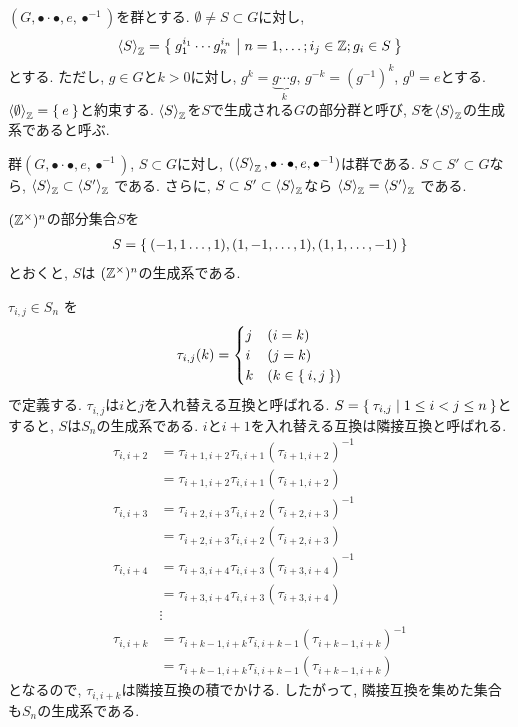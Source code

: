 \begin{definition}
  $(G,\bullet\cdot\bullet,e,\bullet^{-1})$を群とする.
  $\emptyset \neq S\subset G$に対し,
  \begin{align*}
    \Braket{S}_{\mathbb{Z}}=\Set{g_1^{i_1}\cdots g_n^{i_n}|n=1,\ldots;i_j\in \mathbb{Z};g_i\in S}
  \end{align*}
  とする.
  ただし,
  $g\in G$と$k>0$に対し, $g^{k}=\underbrace{g\cdots g}_{k}$,
  $g^{-k}=(g^{-1})^{k}$, $g^0=e$とする.
  $\Braket{\emptyset}_{\mathbb{Z}}=\Set{e}$と約束する.
  $\Braket{S}_{\mathbb{Z}}$を$S$で生成される$G$の部分群と呼び,
  $S$を$\Braket{S}_{\mathbb{Z}}$の生成系であると呼ぶ.
\end{definition}
群$(G,\bullet\cdot\bullet,e,\bullet^{-1})$,
$S\subset G$に対し,
$(\Braket{S}_{\mathbb{Z}},\bullet\cdot\bullet,e,\bullet^{-1})$は群である.
$S\subset S' \subset G$なら,
$\Braket{S}_{\mathbb{Z}}\subset\Braket{S'}_{\mathbb{Z}}$
である.
さらに,
$S\subset S' \subset \Braket{S}_{\mathbb{Z}}$なら
$\Braket{S}_{\mathbb{Z}}=\Braket{S'}_{\mathbb{Z}}$
である.

\begin{example}
$(\mathbb{Z}^\times)^n$の部分集合$S$を
\begin{align*}
  S=\Set{(-1,1\ldots,1),(1,-1,\ldots,1),(1,1,\ldots,-1)}
\end{align*}
とおくと, $S$は
$(\mathbb{Z}^\times)^n$の生成系である.
\end{example}

\begin{example}
$\tau_{i,j}\in S_n$
を
\begin{align*}
  \tau_{i,j}(k)=
  \begin{cases}
    j&(i=k)\\
    i&(j=k)\\
    k&(k\in\Set{i,j})
  \end{cases}
\end{align*}
で定義する.
$\tau_{i,j}$は$i$と$j$を入れ替える互換と呼ばれる.
$S=\Set{\tau_{i,j}|1\leq i<j\leq n}$とすると,
$S$は$S_n$の生成系である.
$i$と$i+1$を入れ替える互換は隣接互換と呼ばれる.
\begin{align*}
  \tau_{i,i+2}
  &=\tau_{i+1,i+2}\tau_{i,i+1}(\tau_{i+1,i+2})^{-1}\\
  &=\tau_{i+1,i+2}\tau_{i,i+1}(\tau_{i+1,i+2})\\
  \tau_{i,i+3}
  &=\tau_{i+2,i+3}\tau_{i,i+2}(\tau_{i+2,i+3})^{-1}\\
  &=\tau_{i+2,i+3}\tau_{i,i+2}(\tau_{i+2,i+3})\\
  \tau_{i,i+4}
  &=\tau_{i+3,i+4}\tau_{i,i+3}(\tau_{i+3,i+4})^{-1}\\
  &=\tau_{i+3,i+4}\tau_{i,i+3}(\tau_{i+3,i+4})\\
  &\vdots\\
  \tau_{i,i+k}
  &=\tau_{i+k-1,i+k}\tau_{i,i+k-1}(\tau_{i+k-1,i+k})^{-1}\\
  &=\tau_{i+k-1,i+k}\tau_{i,i+k-1}(\tau_{i+k-1,i+k})
\end{align*}
となるので,
$\tau_{i,i+k}$は隣接互換の積でかける.
したがって,
隣接互換を集めた集合も$S_n$の生成系である.
\end{example}



